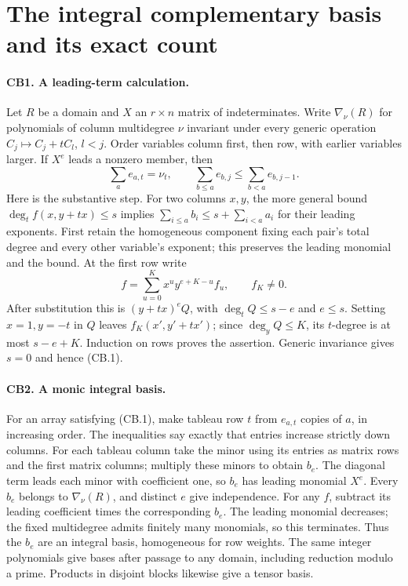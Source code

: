 \section{The integral complementary basis and its exact count}
\label{sec:complementary-basis}


\paragraph{CB1. A leading-term calculation.}
Let $R$ be a domain and $X$ an $r\times n$ matrix of indeterminates.
Write $\nabla_\nu(R)$ for polynomials of column multidegree $\nu$ invariant under every generic operation $C_j\mapsto C_j+tC_l$, $l<j$.
Order variables column first, then row, with earlier variables larger.
If $X^e$ leads a nonzero member, then
\[
 \sum_a e_{a,t}=\nu_t,\qquad
 \sum_{b\le a}e_{b,j}\le\sum_{b<a}e_{b,j-1}. \tag{CB.1}
\]
Here is the substantive step. For two columns $x,y$, the more general bound
$\deg_t f(x,y+tx)\le s$ implies
$\sum_{i\le a}b_i\le s+\sum_{i<a}a_i$ for their leading exponents.
First retain the homogeneous component fixing each pair's total degree and every other variable's exponent; this preserves the leading monomial and the bound.
At the first row write
\[
 f=\sum_{u=0}^{K}x^uy^{e+K-u}f_u,\qquad f_K\ne0.
\]
After substitution this is $(y+tx)^eQ$, with
$\deg_tQ\le s-e$ and $e\le s$.
Setting $x=1,y=-t$ in $Q$ leaves $f_K(x',y'+tx')$; since $\deg_yQ\le K$, its $t$-degree is at most $s-e+K$.
Induction on rows proves the assertion. Generic invariance gives $s=0$ and hence (CB.1).

\paragraph{CB2. A monic integral basis.}
For an array satisfying (CB.1), make tableau row $t$ from $e_{a,t}$ copies of $a$, in increasing order.
The inequalities say exactly that entries increase strictly down columns.
For each tableau column take the minor using its entries as matrix rows and the first matrix columns; multiply these minors to obtain $b_e$.
The diagonal term leads each minor with coefficient one, so $b_e$ has leading monomial $X^e$.
Every $b_e$ belongs to $\nabla_\nu(R)$, and distinct $e$ give independence.
For any $f$, subtract its leading coefficient times the corresponding $b_e$.
The leading monomial decreases; the fixed multidegree admits finitely many monomials, so this terminates.
Thus the $b_e$ are an integral basis, homogeneous for row weights.
The same integer polynomials give bases after passage to any domain, including reduction modulo a prime.
Products in disjoint blocks likewise give a tensor basis.

